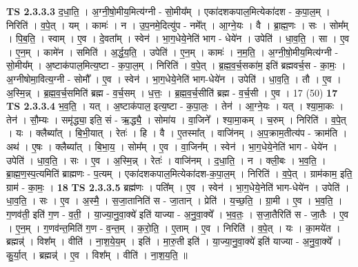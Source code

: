 \documentclass[17pt]{extarticle}
\begin{document}
                  \newline
                                \textbf{ TS 2.3.3.3} \newline
                  द॒धा॒ति॒ । अ॒ग्नी॒षो॒मीय॒मित्य॑ग्नी - सो॒मीय᳚म् । एका॑दशकपाल॒मित्येका॑दश - क॒पा॒ल॒म् । निरिति॑ । व॒पे॒त् । यम् । कामः॑ । न । उ॒प॒नमे॒दित्यु॑प - नमे᳚त् । आ॒ग्ने॒यः । वै । ब्रा॒ह्म॒णः । सः । सोम᳚म् । पि॒ब॒ति॒ । स्वाम् । ए॒व । दे॒वता᳚म् । स्वेन॑ । भा॒ग॒धेये॒नेति॑ भाग - धेये॑न । उपेति॑ । धा॒व॒ति॒ । सा । ए॒व । ए॒न॒म् । कामे॑न । समिति॑ । अ॒र्द्ध॒य॒ति॒ । उपेति॑ । ए॒न॒म् । कामः॑ । न॒म॒ति॒ । अ॒ग्नी॒षो॒मीय॒मित्य॑ग्नी - सो॒मीय᳚म् । अ॒ष्टाक॑पाल॒मित्य॒ष्टा - क॒पा॒ल॒म् । निरिति॑ । व॒पे॒त् । ब्र॒ह्म॒व॒र्च॒सका॑म॒ इति॑ ब्रह्मवर्च॒स - का॒मः॒ । अ॒ग्नीषोमा॒वित्य॒ग्नी - सोमौ᳚ । ए॒व । स्वेन॑ । भा॒ग॒धेये॒नेति॑ भाग-धेये॑न । उपेति॑ । धा॒व॒ति॒ । तौ । ए॒व । अ॒स्मि॒न्न् । ब्र॒ह्म॒व॒र्च॒समिति॑ ब्रह्म - व॒र्च॒सम् । ध॒त्तः॒ । ब्र॒ह्म॒व॒र्च॒सीति॑ ब्रह्म - व॒र्च॒सी । ए॒व । 17 (50) \textbf{  17} \newline
                  \newline
                                \textbf{ TS 2.3.3.4} \newline
                  भ॒व॒ति॒ । यत् । अ॒ष्टाक॑पाल॒ इत्य॒ष्टा - क॒पा॒लः॒ । तेन॑ । आ॒ग्ने॒यः । यत् । श्या॒मा॒कः । तेन॑ । सौ॒म्यः । समृ॑द्ध्या॒ इति॒ सं - ऋ॒द्ध्यै॒ । सोमा॑य । वा॒जिने᳚ । श्या॒मा॒कम् । च॒रुम् । निरिति॑ । व॒पे॒त् । यः । क्लैब्या᳚त् । बि॒भी॒यात् । रेतः॑ । हि । वै । ए॒तस्मा᳚त् । वाजि॑नम् । अ॒प॒क्राम॒तीत्य॑प - क्राम॑ति । अथ॑ । ए॒षः । क्लैब्या᳚त् । बि॒भा॒य॒ । सोम᳚म् । ए॒व । वा॒जिन᳚म् । स्वेन॑ । भा॒ग॒धेये॒नेति॑ भाग - धेये॑न । उपेति॑ । धा॒व॒ति॒ । सः । ए॒व । अ॒स्मि॒न्न् । रेतः॑ । वाजि॑नम् । द॒धा॒ति॒ । न । क्ली॒बः । भ॒व॒ति॒ । ब्रा॒ह्म॒ण॒स्प॒त्यमिति॑ ब्राह्मणः - प॒त्यम् । एका॑दशकपाल॒मित्येका॑दश-क॒पा॒ल॒म् । निरिति॑ । व॒पे॒त् । ग्राम॑काम॒ इति॒ ग्राम॑ - का॒मः॒ । \textbf{  18} \newline
                  \newline
                                \textbf{ TS 2.3.3.5} \newline
                  ब्रह्म॑णः । पति᳚म् । ए॒व । स्वेन॑ । भा॒ग॒धेये॒नेति॑ भाग-धेये॑न । उपेति॑ । धा॒व॒ति॒ । सः । ए॒व । अ॒स्मै॒ । स॒जा॒तानिति॑ स - जा॒तान् । प्रेति॑ । य॒च्छ॒ति॒ । ग्रा॒मी । ए॒व । भ॒व॒ति॒ । ग॒णव॑ती॒ इति॑ ग॒ण - व॒ती॒ । या॒ज्या॒नु॒वा॒क्ये॑ इति॑ याज्या - अ॒नु॒वा॒क्ये᳚ । भ॒व॒तः॒ । स॒जा॒तैरिति॑ स - जा॒तैः । ए॒व । ए॒न॒म् । ग॒णव॑न्त॒मिति॑ ग॒ण - व॒न्त॒म् । क॒रो॒ति॒ । ए॒ताम् । ए॒व । निरिति॑ । व॒पे॒त् । यः । का॒मये॑त । ब्रह्मन्न्॑ । विश᳚म् । वीति॑ । ना॒श॒ये॒य॒म् । इति॑ । मा॒रु॒ती इति॑ । या॒ज्या॒नु॒वा॒क्ये॑ इति॑ याज्या - अ॒नु॒वा॒क्ये᳚ । कु॒र्या॒त् । ब्रह्मन्न्॑ । ए॒व । विश᳚म् । वीति॑ । ना॒श॒य॒ति॒ ॥ \textbf{ } \newline
\end{document}
